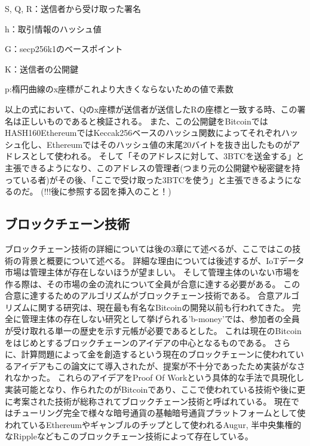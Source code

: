 \begin{list}{}{}
\item S, Q, R：送信者から受け取った署名
\item h：取引情報のハッシュ値
\item G：secp256k1のベースポイント
\item K：送信者の公開鍵
\item p:楕円曲線のx座標がこれより大きくならないための値で素数
\end{list}

以上の式において、Qのx座標が送信者が送信したRの座標と一致する時、この署名は正しいものであると検証される。
また、この公開鍵をBitcoinではHASH160EthereumではKeccak256ベースのハッシュ関数によってそれぞれハッシュ化し、Ethereumではそのハッシュ値の末尾20バイトを抜き出したものがアドレスとして使われる。
そして「そのアドレスに対して、3BTCを送金する」と主張できるようになり、このアドレスの管理者(つまり元の公開鍵や秘密鍵を持っている者)がその後、「ここで受け取った3BTCを使う」と主張できるようになるのだ。
(!!!後に参照する図を挿入のこと！)

\subsection{ブロックチェーン技術}
ブロックチェーン技術の詳細については後の3章にて述べるが、ここではこの技術の背景と概要について述べる。
詳細な理由については後述するが、IoTデータ市場は管理主体が存在しないほうが望ましい。
そして管理主体のいない市場を作る際は、その市場の金の流れについて全員が合意に達する必要がある。
この合意に達するためのアルゴリズムがブロックチェーン技術である。
合意アルゴリズムに関する研究は、現在最も有名なBitcoin\cite{Bitcoin}の開発以前も行われてきた。
完全に管理主体の存在しない研究として挙げられる'b-money'\cite{b-money}では、参加者の全員が受け取れる単一の歴史を示す元帳が必要であるとした。
これは現在のBitcoinをはじめとするブロックチェーンのアイデアの中心となるものである。
さらに、計算問題によって金を創造するという現在のブロックチェーンに使われているアイデアもこの論文にて導入されたが、提案が不十分であったため実装がなされなかった。
これらのアイデアをProof Of Workという具体的な手法で具現化し実装可能となり、作られたのがBitcoinであり、ここで使われている技術や後に更に考案された技術が総称されてブロックチェーン技術と呼ばれている。
現在ではチューリング完全で様々な暗号通貨の基軸暗号通貨プラットフォームとして使われているEthereum\cite{ethereum}やギャンブルのチップとして使われるAugur\cite{Augur}, 半中央集権的なRipple\cite{Ripple}などもこのブロックチェーン技術によって存在している。

